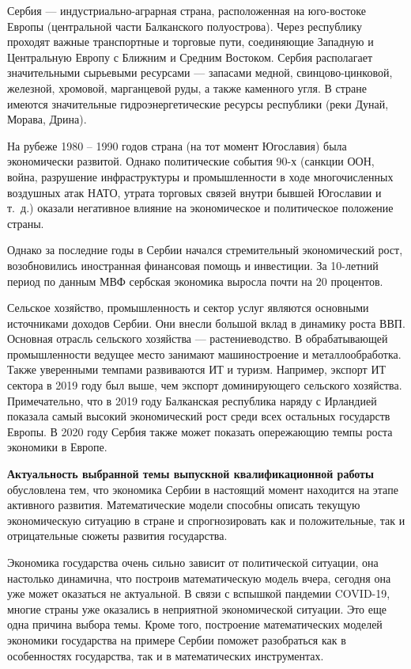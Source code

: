 \Introduction

Сербия --- индустриально-аграрная страна, расположенная на юго-востоке Европы (центральной части Балканского полуострова).
Через республику проходят важные транспортные и торговые пути, соединяющие Западную и Центральную Европу с Ближним и Средним Востоком.
Сербия располагает значительными сырьевыми ресурсами --- запасами медной, свинцово-цинковой, железной, хромовой, марганцевой руды, а также каменного угля.
В стране имеются значительные гидроэнергетические ресурсы республики (реки Дунай, Морава, Дрина).

На рубеже 1980 -- 1990 годов страна (на тот момент Югославия) была экономически развитой.
Однако политические события 90-х (санкции ООН, война, разрушение инфраструктуры и промышленности в ходе многочисленных воздушных атак НАТО, утрата торговых связей внутри бывшей Югославии и т.~д.) оказали негативное влияние на экономическое и политическое положение страны.

Однако за последние годы в Сербии начался стремительный экономический рост, возобновились иностранная финансовая помощь и инвестиции.
За 10-летний период по данным МВФ сербская экономика выросла почти на 20 процентов.

Сельское хозяйство, промышленность и сектор услуг являются основными источниками доходов Сербии.
Они внесли большой вклад в динамику роста ВВП.
Основная отрасль сельского хозяйства --- растениеводство.
В обрабатывающей промышленности ведущее место занимают машиностроение и металлообработка.
Также уверенными темпами развиваются ИТ и туризм.
Например, экспорт ИТ сектора в 2019 году был выше, чем экспорт доминирующего сельского хозяйства.
Примечательно, что в 2019 году Балканская республика наряду с Ирландией показала самый высокий экономический рост среди всех остальных государств Европы.
В 2020 году Сербия также может показать опережающию темпы роста экономики в Европе.

\textbf{Актуальность выбранной темы выпускной квалификационной работы } обусловлена тем, что экономика Сербии в настоящий момент находится на этапе активного развития.
Математические модели способны описать текущую экономическую ситуацию в стране и спрогнозировать как и положительные, так и отрицательные сюжеты развития государства.

Экономика государства очень сильно зависит от политической ситуации, она настолько динамична, что построив математическую модель вчера, сегодня она уже может оказаться не актуальной. В связи с вспышкой пандемии COVID-19, многие страны уже оказались в неприятной экономической ситуации.
Это еще одна причина выбора темы.
Кроме того, построение математических моделей экономики государства на примере Сербии поможет разобраться как в особенностях государства, так и в математических инструментах.

